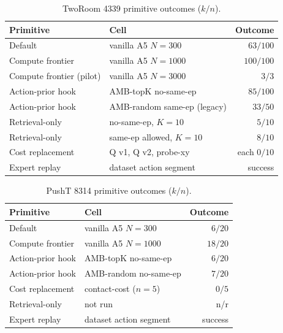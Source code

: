 \documentclass{article}
\begin{document}
\begin{table}[ht]
\centering\small
\caption{TwoRoom 4339 primitive outcomes ($k/n$).}
\label{tab:slice-tworoom}
\begin{tabular}{llr}
\toprule
Primitive & Cell & Outcome \\
\midrule
Default                  & vanilla A5 $N{=}300$        & $63/100$ \\
Compute frontier         & vanilla A5 $N{=}1000$       & $100/100$ \\
Compute frontier (pilot) & vanilla A5 $N{=}3000$       & $3/3$ \\
Action-prior hook        & AMB-topK no-same-ep         & $85/100$ \\
Action-prior hook        & AMB-random same-ep (legacy) & $33/50$ \\
Retrieval-only           & no-same-ep, $K{=}10$         & $5/10$ \\
Retrieval-only           & same-ep allowed, $K{=}10$    & $8/10$ \\
Cost replacement         & Q v1, Q v2, probe-xy         & each $0/10$ \\
Expert replay            & dataset action segment       & success \\
\bottomrule
\end{tabular}
\end{table}

\begin{table}[ht]
\centering\small
\caption{PushT 8314 primitive outcomes ($k/n$).}
\label{tab:slice-pusht8314}
\begin{tabular}{llr}
\toprule
Primitive & Cell & Outcome \\
\midrule
Default            & vanilla A5 $N{=}300$        & $6/20$ \\
Compute frontier   & vanilla A5 $N{=}1000$       & $18/20$ \\
Action-prior hook  & AMB-topK no-same-ep         & $6/20$ \\
Action-prior hook  & AMB-random no-same-ep       & $7/20$ \\
Cost replacement   & contact-cost ($n{=}5$)       & $0/5$ \\
Retrieval-only     & not run                     & n/r \\
Expert replay      & dataset action segment       & success \\
\bottomrule
\end{tabular}
\end{table}
\end{document}
